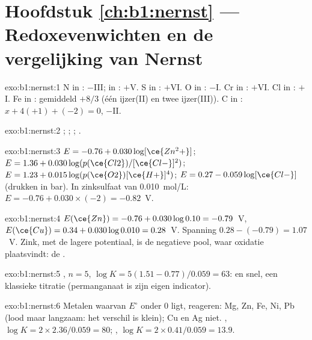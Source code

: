\section*{Hoofdstuk \ref{ch:b1:nernst} --- Redoxevenwichten en de vergelijking van Nernst}

\begin{solution}{exo:b1:nernst:1}
N in : $-$III; in : $+$V. S in : $+$VI. O in
: $-$I. Cr in : $+$VI. Cl in : $+$I. Fe in
: gemiddeld $+8/3$ (één ijzer(II) en twee ijzer(III)). C in
: $x + 4(+1) + (-2) = 0$, $-$II.
\end{solution}

\begin{solution}{exo:b1:nernst:2}
;
;
;
.
\end{solution}

\begin{solution}{exo:b1:nernst:3}
$E = -0.76 + 0.030\log[\ce{Zn^2+}]$; $E = 1.36 + 0.030\log(p(\ce{Cl2})/[\ce{Cl-}]^2)$;
$E = 1.23 + 0.015\log(p(\ce{O2})[\ce{H+}]^4)$; $E = 0.27 - 0.059\log[\ce{Cl-}]$
(drukken in bar). In zinksulfaat van \qty{0.010}{mol/L}:
$E = -0.76 + 0.030 \times (-2) = -0.82$~V.
\end{solution}

\begin{solution}{exo:b1:nernst:4}
$E(\ce{Zn}) = -0.76 + 0.030\log 0.10 = -0.79$~V, $E(\ce{Cu}) = 0.34 +
0.030\log 0.010 = 0.28$~V. Spanning $0.28 - (-0.79) = 1.07$~V. Zink, met
de lagere potentiaal, is de negatieve pool, waar oxidatie plaatsvindt:
de .
\end{solution}

\begin{solution}{exo:b1:nernst:5}
, $n = 5$,
$\log K = 5(1.51 - 0.77)/0.059 = 63$:  en snel, een
klassieke titratie (permanganaat is zijn eigen indicator).
\end{solution}

\begin{solution}{exo:b1:nernst:6}
Metalen waarvan $E^\circ$ onder 0 ligt, reageren: Mg, Zn, Fe, Ni, Pb
(lood maar langzaam: het verschil is klein); Cu en Ag niet.
, $\log K = 2 \times 2.36/0.059 = 80$;
, $\log K = 2 \times 0.41/0.059 = 13.9$.
\end{solution}

